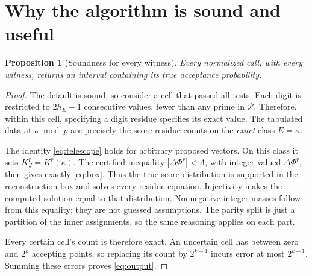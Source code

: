 \documentclass[11pt,letterpaper]{article}
\newtheorem{proposition}[theorem]{Proposition}
\theoremstyle{definition}
\theoremstyle{remark}
\newcommand{\abs}[1]{\left|#1\right|}
\newcommand{\cP}{\mathcal P}
\begin{document}
\section{Why the algorithm is sound and useful}\label{sec:analysis}

\begin{proposition}[Soundness for every witness]\label{prop:sound}
Every normalized call, with every witness, returns an interval
containing its true acceptance probability.
\end{proposition}
\begin{proof}
The default is sound, so consider a cell that passed all tests.
Each digit is restricted to \(2h_E-1\) consecutive values, fewer
than any prime in \(\cP\). Therefore, within this cell, specifying a
digit residue specifies its exact value. The tabulated data at
\(\kappa\bmod p\) are precisely the score-residue counts on the
\emph{exact} class \(E=\kappa\).

The identity \eqref{eq:telescope} holds for arbitrary proposed
vectors. On this class it sets \(K_J^r=K^r(\kappa)\).
The certified inequality \(\abs{\Delta\Phi^r}<\Lambda\), with
integer-valued \(\Delta\Phi^r\), then gives exactly \eqref{eq:box}.
Thus the true score distribution is supported in the reconstruction
box and solves every residue equation. Injectivity makes the
computed solution equal to that distribution. Nonnegative integer
masses follow from this equality; they are not guessed assumptions.
The parity split is just a partition of the inner assignments, so
the same reasoning applies on each part.

Every certain cell's count is therefore exact. An uncertain cell
has between zero and \(2^k\) accepting points, so replacing its
count by \(2^{k-1}\) incurs error at most \(2^{k-1}\).
Summing these errors proves \eqref{eq:output}.
\end{proof}
\end{document}
